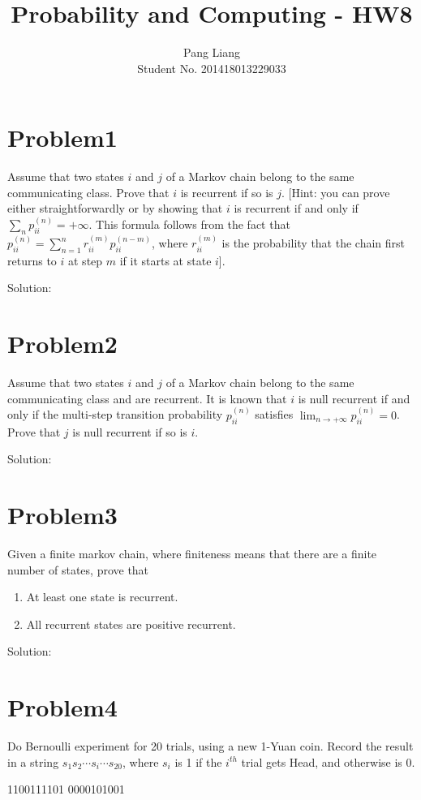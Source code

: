 \documentclass[12pt]{article}
\title{Probability and Computing - HW8}
\author{Pang Liang\\ Student No. 201418013229033}
\begin{document}
\maketitle

\section{Problem1}
Assume that two states $i$ and $j$ of a Markov chain belong to the same communicating class. Prove that $i$ is recurrent if so is $j$. [Hint: you can prove either straightforwardly or by showing that $i$ is recurrent if and only if $\sum_n p_{ii}^{(n)} = +\infty$. This formula follows from the fact that $p_{ii}^{(n)} = \sum_{n=1}^n r_{ii}^{(m)} p_{ii}^{(n-m)} $, where $r_{ii}^{(m)}$ is the probability that the chain first returns to $i$ at step $m$ if it starts at state $i$].

Solution:\\


\section{Problem2}
Assume that two states $i$ and $j$ of a Markov chain belong to the same communicating class and are recurrent. It is known that $i$ is null recurrent if and only if the multi-step transition probability $p_{ii}^{(n)} $ satisfies $\lim_{n \to +\infty}p_{ii}^{(n)} = 0 $. Prove that $j$ is null recurrent if so is $i$.

Solution:\\

\section{Problem3}
Given a finite markov chain, where finiteness means that there are a finite number of states, prove that
\begin{enumerate}
\item At least one state is recurrent.
\item All recurrent states are positive recurrent.
\end{enumerate}

Solution:\\

\section{Problem4}
Do Bernoulli experiment for 20 trials, using a new 1-Yuan coin. Record the result in a
string $s_1s_2 \cdots s_i \cdots s_{20}$, where $s_i$ is 1 if the $i^{th}$ trial gets Head, and otherwise is 0.

1100111101 0000101001
\end{document}
